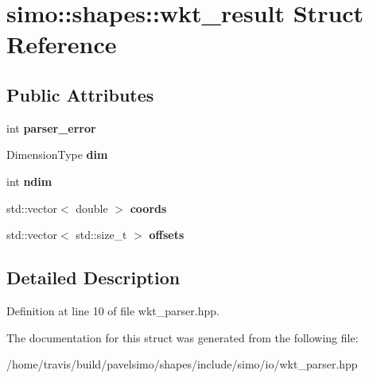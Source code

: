 \hypertarget{structsimo_1_1shapes_1_1wkt__result}{\section{simo\-:\-:shapes\-:\-:wkt\-\_\-result Struct Reference}
\label{structsimo_1_1shapes_1_1wkt__result}
}
\subsection*{Public Attributes}
\begin{DoxyCompactItemize}
\item 
\hypertarget{structsimo_1_1shapes_1_1wkt__result_ad21b447b14cd0e0e5abcf0dab6541405}{int {\bfseries parser\-\_\-error}}\label{structsimo_1_1shapes_1_1wkt__result_ad21b447b14cd0e0e5abcf0dab6541405}

\item 
\hypertarget{structsimo_1_1shapes_1_1wkt__result_aca8a845a61afb6eb33bb20e4c955ae19}{Dimension\-Type {\bfseries dim}}\label{structsimo_1_1shapes_1_1wkt__result_aca8a845a61afb6eb33bb20e4c955ae19}

\item 
\hypertarget{structsimo_1_1shapes_1_1wkt__result_a59af624bbd0230c451cebc3f264d3638}{int {\bfseries ndim}}\label{structsimo_1_1shapes_1_1wkt__result_a59af624bbd0230c451cebc3f264d3638}

\item 
\hypertarget{structsimo_1_1shapes_1_1wkt__result_a9452d4f908125eef6e6d20a977a314dd}{std\-::vector$<$ double $>$ {\bfseries coords}}\label{structsimo_1_1shapes_1_1wkt__result_a9452d4f908125eef6e6d20a977a314dd}

\item 
\hypertarget{structsimo_1_1shapes_1_1wkt__result_a54483bd061e9e29ca75bfb3da2dee955}{std\-::vector$<$ std\-::size\-\_\-t $>$ {\bfseries offsets}}\label{structsimo_1_1shapes_1_1wkt__result_a54483bd061e9e29ca75bfb3da2dee955}

\end{DoxyCompactItemize}


\subsection{Detailed Description}


Definition at line 10 of file wkt\-\_\-parser.\-hpp.



The documentation for this struct was generated from the following file\-:\begin{DoxyCompactItemize}
\item 
/home/travis/build/pavelsimo/shapes/include/simo/io/wkt\-\_\-parser.\-hpp\end{DoxyCompactItemize}
